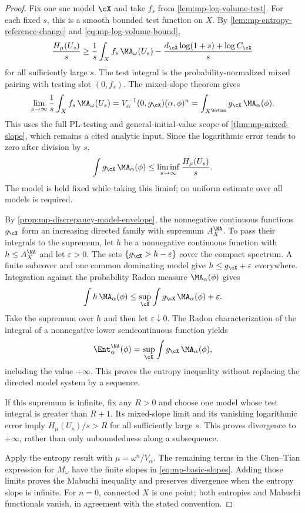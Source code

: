 \begin{proof}
Fix one snc model $\cX$ and take $f_s$ from \cref{lem:mp-log-volume-test}. For each fixed $s$, this is a smooth bounded test function on $X$. By \cref{lem:mp-entropy-reference-change} and \eqref{eq:mp-log-volume-bound},
\[
 \frac{H_\mu(U_s)}s\geq
 \frac1s\int_X f_s\,\MA_\omega(U_s)
       -\frac{d_{\cX}\log(1+s)+\log C_{\cX}}s
\]
for all sufficiently large $s$. The test integral is the probability-normalized mixed pairing with testing slot $(0,f_s)$. The mixed-slope theorem gives
\[
 \lim_{s\to\infty}\frac1s\int_Xf_s\,\MA_\omega(U_s)
 =V_\alpha^{-1}(0,g_{\cX})(\alpha,\phi)^n
 =\int_{X^{\bethan}}g_{\cX}\,\MA_\alpha(\phi).
\]
This uses the full PL-testing and general-initial-value scope of \cref{thm:mp-mixed-slope}, which remains a cited analytic input. Since the logarithmic error tends to zero after division by $s$,
\[
 \int g_{\cX}\,\MA_\alpha(\phi)
       \leq\liminf_{s\to\infty}\frac{H_\mu(U_s)}s.
\]
The model is held fixed while taking this liminf; no uniform estimate over all models is required.

By \cref{prop:mp-discrepancy-model-envelope}, the nonnegative continuous functions $g_{\cX}$ form an increasing directed family with supremum $A_X^{\NA}$. To pass their integrals to the supremum, let $h$ be a nonnegative continuous function with $h\leq A_X^{\NA}$ and let $\varepsilon>0$. The sets $\{g_{\cX}>h-\varepsilon\}$ cover the compact spectrum. A finite subcover and one common dominating model give $h\leq g_{\cX}+\varepsilon$ everywhere. Integration against the probability Radon measure $\MA_\alpha(\phi)$ gives
\[
 \int h\,\MA_\alpha(\phi)
       \leq\sup_{\cX}\int g_{\cX}\,\MA_\alpha(\phi)+\varepsilon.
\]
Take the supremum over $h$ and then let $\varepsilon\downarrow0$. The Radon characterization of the integral of a nonnegative lower semicontinuous function yields
\[
 \Ent_\alpha^{\NA}(\phi)
       =\sup_{\cX}\int g_{\cX}\,\MA_\alpha(\phi),
\]
including the value $+\infty$. This proves the entropy inequality without replacing the directed model system by a sequence.

If this supremum is infinite, fix any $R>0$ and choose one model whose test integral is greater than $R+1$. Its mixed-slope limit and its vanishing logarithmic error imply $H_\mu(U_s)/s>R$ for all sufficiently large $s$. This proves divergence to $+\infty$, rather than only unboundedness along a subsequence.

Apply the entropy result with $\mu=\omega^n/V_\alpha$. The remaining terms in the Chen--Tian expression for $M_\omega$ have the finite slopes in \eqref{eq:mp-basic-slopes}. Adding those limits proves the Mabuchi inequality and preserves divergence when the entropy slope is infinite. For $n=0$, connected $X$ is one point; both entropies and Mabuchi functionals vanish, in agreement with the stated convention.
\end{proof}

